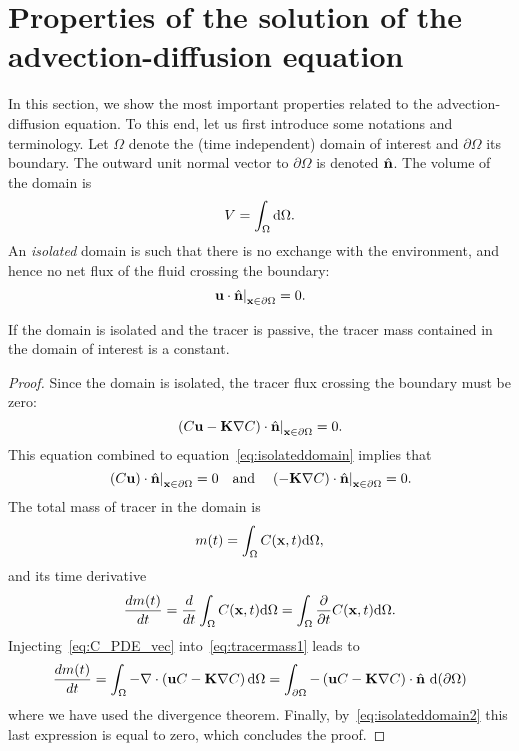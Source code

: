\section{Properties of the solution of the advection-diffusion equation}
In this section, we show the most important properties related to the advection-diffusion equation. To this end, let us first introduce some notations and terminology. Let $\Omega$ denote the (time independent) domain of interest and $\partial \Omega$ its boundary. The outward unit normal vector to $\partial \Omega$ is denoted $\hat{\b n}$. The volume of the domain is
\begin{equation}
	V = \int_{\Omega} \rm d\Omega.	
\end{equation}
An \textit{isolated} domain is such that there is no exchange with the environment, and hence no net flux of the fluid crossing the boundary:
\begin{equation} \label{eq:isolateddomain}
	\left. \b u \cdot \hat{\b n}\right|_{\b x \in \partial \Omega} = 0.
\end{equation}

\begin{property} \label{prop:mass-is-constant}
	If the domain is isolated and the tracer is passive, the tracer mass contained in the domain of interest is a constant.
\end{property}
\begin{proof}
	Since the domain is isolated, the tracer flux crossing the boundary must be zero:
	\begin{equation} \label{eq:isolateddomain2}
		\left. (C\b u - \b K \nabla C)\cdot \n \right|_{\b x \in \partial \Omega} = 0.
	\end{equation}
	This equation combined to equation~\eqref{eq:isolateddomain} implies that
	\begin{equation} \label{eq:isolateddomain3}
		\left. (C\b u)\cdot \n \right|_{\b x \in \partial \Omega} = 0 \quad \mbox{and} \quad \left. (- \b K \nabla C)\cdot \n \right|_{\b x \in \partial \Omega} = 0.
	\end{equation}
	The total mass of tracer in the domain is
	\begin{equation}
		m(t) = \int_{\Omega} C(\b x,t) \rm d\Omega,
	\end{equation}
	and its time derivative
	\begin{equation} \label{eq:tracermass1}
		\frac{dm(t)}{dt} = \frac{d}{dt} \int_{\Omega} C(\b x,t) \rm d\Omega = \int_{\Omega} \frac{\partial}{\partial t} C(\b x,t) \rm d\Omega.
	\end{equation}
	Injecting~\eqref{eq:C_PDE_vec} into~\eqref{eq:tracermass1} leads to
	\begin{equation}
		\frac{dm(t)}{dt} = \int_{\Omega} -\nabla \cdot \left(\b uC - \b K \nabla C\right) \rm d\Omega = \int_{\partial \Omega} -\left(\b uC - \b K \nabla C\right) \cdot \n \ \rm d(\partial \Omega)
	\end{equation}
	where we have used the divergence theorem. Finally, by~\eqref{eq:isolateddomain2} this last expression is equal to zero, which concludes the proof.
\end{proof}

